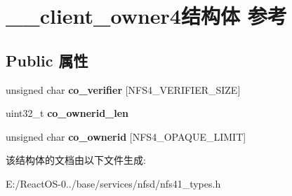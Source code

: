 \hypertarget{struct____client__owner4}{}\section{\+\_\+\+\_\+client\+\_\+owner4结构体 参考}
\label{struct____client__owner4}
\subsection*{Public 属性}
\begin{DoxyCompactItemize}
\item 
\mbox{\label{struct____client__owner4_ab8462c0441ea481a498597330d846d85}} 
unsigned char {\bfseries co\+\_\+verifier} \mbox{[}N\+F\+S4\+\_\+\+V\+E\+R\+I\+F\+I\+E\+R\+\_\+\+S\+I\+ZE\mbox{]}
\item 
\mbox{\label{struct____client__owner4_a4d341f70b5d8bc25aebb013a36a72a96}} 
uint32\+\_\+t {\bfseries co\+\_\+ownerid\+\_\+len}
\item 
\mbox{\label{struct____client__owner4_a1bb069f022df7d8117c057cf86dd2dc6}} 
unsigned char {\bfseries co\+\_\+ownerid} \mbox{[}N\+F\+S4\+\_\+\+O\+P\+A\+Q\+U\+E\+\_\+\+L\+I\+M\+IT\mbox{]}
\end{DoxyCompactItemize}


该结构体的文档由以下文件生成\+:\begin{DoxyCompactItemize}
\item 
E\+:/\+React\+O\+S-\/0../base/services/nfsd/nfs41\+\_\+types.\+h\end{DoxyCompactItemize}
